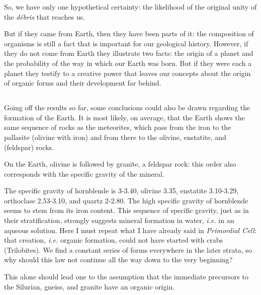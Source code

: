 \documentclass[a4paper, 12pt, oneside]{article}
\begin{document}
So, we have only one hypothetical certainty: the likelihood of the original unity of the \emph{débris} that reaches us.

But if they came from Earth, then they have been parts of it: the composition of organisms is still a fact that is important for our geological history. However, if they do not come from Earth they illustrate two facts: the origin of a planet and the probability of the way in which our Earth was born. But if they were each a planet they testify to a creative power that leaves our concepts about the origin of organic forms and their development far behind.
\clearpage
\subsection{}
\paragraph*{}
Going off the results so far, some conclusions could also be drawn regarding the formation of the Earth. It is most likely, on average, that the Earth shows the same sequence of rocks as the meteorites, which pass from the iron to the pallasite (olivine with iron) and from there to the olivine, enstatite, and (feldspar) rocks.

On the Earth, olivine is followed by granite, a feldspar rock: this order also corresponds with the specific gravity of the mineral.

The specific gravity of hornblende is 3-3.40, olivine 3.35, enstatite 3.10-3.29, orthoclase 2.53-3.10, and quartz 2-2.80. The high specific gravity of hornblende seems to stem from its iron content. This sequence of specific gravity, just as in their stratification, strongly suggests mineral formation in water, \emph{i.e.} in an aqueous solution. Here I must repeat what I have already said in \emph{Primordial Cell}: that creation, \emph{i.e.} organic formation, could not have started with crabs (Trilobites). We find a constant series of forms everywhere in the later strata, so why should this law not continue all the way down to the very beginning?

This alone should lead one to the assumption that the immediate precursors to the Silurian, gneiss, and granite have an organic origin.
\end{document}
